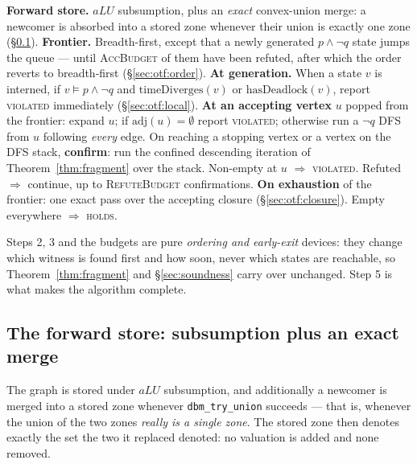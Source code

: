 \begin{algorithm}[h]
\caption{On-the-fly leads-to. Returns \textsc{holds} or \textsc{violated}.}
\label{alg:otf}
\begin{algorithmic}[1]
\State \textbf{Forward store.} $aLU$ subsumption, plus an \emph{exact} convex-union merge: a
       newcomer is absorbed into a stored zone whenever their union is exactly one zone
       (\S\ref{sec:otf:merge}).
\State \textbf{Frontier.} Breadth-first, except that a newly generated $p \wedge \lnot q$ state
       jumps the queue --- until \textsc{AccBudget} of them have been refuted, after which the
       order reverts to breadth-first (\S\ref{sec:otf:order}).
\State \textbf{At generation.} When a state $v$ is interned, if $v \models p \wedge \lnot q$ and
       $\mathrm{timeDiverges}(v)$ or $\mathrm{hasDeadlock}(v)$, report \textsc{violated}
       immediately (\S\ref{sec:otf:local}).
\State \textbf{At an accepting vertex} $u$ popped from the frontier: expand $u$; if
       $\mathrm{adj}(u) = \emptyset$ report \textsc{violated}; otherwise run a $\lnot q$ DFS from
       $u$ following \emph{every} edge. On reaching a stopping vertex or a vertex on the DFS
       stack, \textbf{confirm}: run the confined descending iteration of
       Theorem~\ref{thm:fragment} over the stack. Non-empty at $u$ $\Rightarrow$
       \textsc{violated}. Refuted $\Rightarrow$ continue, up to \textsc{RefuteBudget}
       confirmations.
\State \textbf{On exhaustion} of the frontier: one exact pass over the accepting closure
       (\S\ref{sec:otf:closure}). Empty everywhere $\Rightarrow$ \textsc{holds}.
\end{algorithmic}
\end{algorithm}

Steps 2, 3 and the budgets are pure \emph{ordering and early-exit} devices: they change which
witness is found first and how soon, never which states are reachable, so
Theorem~\ref{thm:fragment} and \S\ref{sec:soundness} carry over unchanged. Step 5 is what makes
the algorithm complete.

\subsection{The forward store: subsumption plus an exact merge}
\label{sec:otf:merge}

The graph is stored under $aLU$ subsumption, and additionally a newcomer is merged into a stored
zone whenever \texttt{dbm\_try\_union} succeeds --- that is, whenever the union of the two zones
\emph{really is a single zone}. The stored zone then denotes exactly the set the two it replaced
denoted: no valuation is added and none removed.

